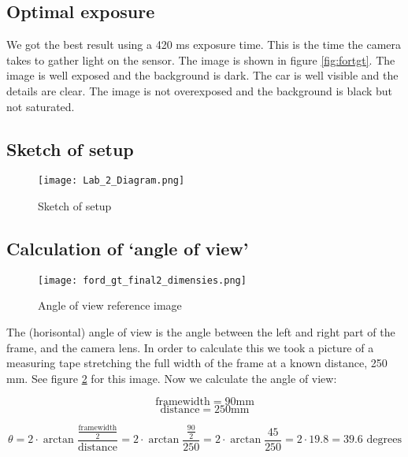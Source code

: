 \subsection{Optimal exposure}

We got the best result using a 420 ms exposure time. This is the time the camera takes to gather light on the sensor. The image is shown in figure \ref{fig:fortgt}. The image is well exposed and the background is dark. The car is well visible and the details are clear. The image is not overexposed and the background is black but not saturated. 

\subsection{Sketch of setup}
\label{sec:sketch}

\begin{figure}[H]
    \centering
    \texttt{[image: Lab\_2\_Diagram.png]}
    \caption{Sketch of setup}
    \label{fig:sketch}
\end{figure}

\subsection{Calculation of ‘angle of view’}
\label{sec:angle_of_view}

\begin{figure}[h!]
    \centering
    \texttt{[image: ford\_gt\_final2\_dimensies.png]}
    \caption{Angle of view reference image}
    \label{fig:angleofview}
\end{figure}

The (horisontal) angle of view is the angle between the left and right part of the frame, and the camera lens. In order to calculate this we took a picture of a measuring tape stretching the full width of the frame at a known distance, 250 mm. See figure \ref{fig:angleofview} for this image. Now we calculate the angle of view:

$$ \text{framewidth} = 90\text{mm} $$
$$ \text{distance} = 250\text{mm}$$

\begin{equation}
    \theta = 2 \cdot \arctan{\frac{{\frac{\text{framewidth}}{2}}}{\text{distance}}} = 2 \cdot \arctan{\frac{\frac{90}{2}}{250}} = 2 \cdot \arctan{\frac{45}{250}} = 2 \cdot 19.8 = 39.6 \text{ degrees}
\end{equation}

